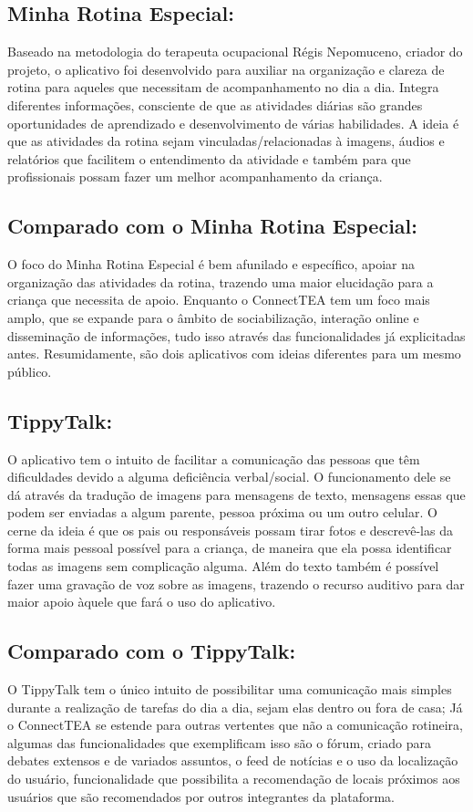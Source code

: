 \begin{apendicesenv}
	\subsection{Minha Rotina Especial:}
	Baseado na metodologia do terapeuta ocupacional Régis Nepomuceno, criador do projeto, o aplicativo foi desenvolvido para auxiliar na organização e clareza de rotina para aqueles que necessitam de acompanhamento no dia a dia.
	Integra diferentes informações, consciente de que as atividades diárias são grandes oportunidades de aprendizado e desenvolvimento de várias habilidades.
	A ideia é que as atividades da rotina sejam vinculadas/relacionadas à imagens, áudios e relatórios que facilitem o entendimento da atividade e também para que profissionais possam fazer um melhor acompanhamento da criança.
	
	\subsection{Comparado com o Minha Rotina Especial:}
	O foco do Minha Rotina Especial é bem afunilado e específico, apoiar na organização das atividades da rotina, trazendo uma maior elucidação para a criança que necessita de apoio. Enquanto o ConnectTEA tem um foco mais amplo, que se expande para o âmbito de sociabilização, interação online e disseminação de informações, tudo isso através das funcionalidades já explicitadas antes. Resumidamente, são dois aplicativos com ideias diferentes para um mesmo público.
	
	
	\subsection{TippyTalk:}
	O aplicativo tem o intuito de facilitar a comunicação das pessoas que têm dificuldades devido a alguma deficiência verbal/social. O funcionamento dele se dá através da tradução de imagens para mensagens de texto, mensagens essas que podem ser enviadas a algum parente, pessoa próxima ou um outro celular.
	O cerne da ideia é que os pais ou responsáveis possam tirar fotos e descrevê-las da forma mais pessoal possível para a criança, de maneira que ela possa identificar todas as imagens sem complicação alguma.
	Além do texto também é possível fazer uma gravação de voz sobre as imagens, trazendo o recurso auditivo para dar maior apoio àquele que fará o uso do aplicativo.
	
	\subsection{Comparado com o TippyTalk:}
	O TippyTalk tem o único intuito de possibilitar uma comunicação mais simples durante a realização de tarefas do dia a dia, sejam elas dentro ou fora de casa; Já o ConnectTEA se estende para outras vertentes que não a comunicação rotineira, algumas das funcionalidades que exemplificam isso são o fórum, criado para debates extensos e de variados assuntos, o feed de notícias e o uso da localização do usuário, funcionalidade que possibilita a recomendação de locais próximos aos usuários que são recomendados por outros integrantes da plataforma.
	

\end{apendicesenv}
